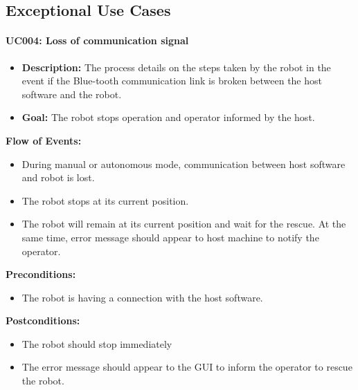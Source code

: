 \documentclass[11pt, a4paper]{report}
\begin{document}
\subsection{Exceptional Use Cases}
\paragraph {UC004: Loss of communication signal}
	\begin{itemize}
		\item \textbf{Description:} The process details on the steps taken by the robot in the event if the Blue-tooth communication link is broken between the host software and the robot.
		\item \textbf{Goal:} The robot stops operation and operator informed by the host.
	\end{itemize}
		\textbf{Flow of Events:}
	\begin{itemize}
		\item During manual or autonomous mode, communication between host software and
robot is lost.
		\item The robot stops at its current position.
		\item The robot will remain at its current position and wait for the rescue. At the same time, error message should appear to host machine to notify the operator.
	\end{itemize}
	\textbf{Preconditions:}
	\begin{itemize}
		\item The robot is having a connection with the host software.
	\end{itemize}
	\textbf{Postconditions:}
	\begin{itemize}
		\item The robot should stop immediately
		\item The error message should appear to the GUI to inform the operator to rescue the robot.
	\end{itemize}
\pagebreak
\end{document}
